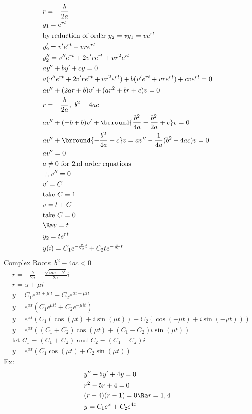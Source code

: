 \begin{align*}
    &r=-\frac{b}{2a}\\
    &y_1=e^{rt}\\
    &\text{by reduction of order }y_2=vy_1=ve^{rt}\\
    &y_2'=v'e^{rt}+vre^{rt}\\
    &y_2''=v''e^{rt}+2v're^{rt}+vr^2e^{rt}\\
    &ay''+by'+cy=0\\
    &a(v''e^{rt}+2v're^{rt}+vr^2e^{rt})+b(v'e^{rt}+vre^{rt})+cve^{rt}=0\\
    &av''+(2ar+b)v'+(ar^2+br+c)v=0\\
    &r=-\frac{b}{2a},\ b^2-4ac\\
    &av''+(-b+b)v'+\brround{\frac{b^2}{4a}-\frac{b^2}{2a}+c}v=0\\
    &av''+\brround{-\frac{b^2}{4a}+c}v=av''-\frac{1}{4a}(b^2-4ac)v=0\\
    &av''=0\\
    &a\neq0\text{ for 2nd order equations}\\
    &\therefore v''=0\\
    &v'=C\\
    &\text{take }C=1\\
    &v=t+C\\
    &\text{take }C=0\\
    &\Ra v=t\\
    &y_2=te^{rt}\\
    &y(t)=C_1e^{-\frac{b}{2a}t}+C_2te^{-\frac{b}{2a}t}
\end{align*}
Complex Roots: $b^2-4ac<0$
\begin{align*}
    &r=-\frac{b}{2a}\pm\frac{\sqrt{4ac-b^2}}{2a}i\\
    &r=\alpha\pm\mu i\\
    &y=C_1e^{\alpha t+\mu it}+C_2e^{\alpha t-\mu it}\\
    &y=e^{\alpha t}(C_1e^{\mu it}+C_2e^{-\mu it})\\
    &y=e^{\alpha t}(C_1(\cos(\mu t)+i\sin(\mu t))+C_2(\cos(-\mu t)+i\sin(-\mu t)))\\
    &y=e^{\alpha t}((C_1+C_2)\cos(\mu t)+(C_1-C_2)i\sin(\mu t))\\
    &\text{let }C_1=(C_1+C_2)\text{ and }C_2=(C_1-C_2)i\\
    &y=e^{\alpha t}(C_1\cos(\mu t)+C_2\sin(\mu t))
\end{align*}
Ex:
\begin{align*}
    &y''-5y'+4y=0\\
    &r^2-5r+4=0\\
    &(r-4)(r-1)=0\Ra r=1,4\\
    &y=C_1e^{x}+C_2e^{4x}
\end{align*}
